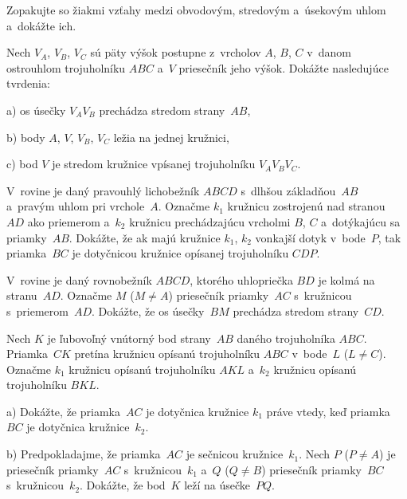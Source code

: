 {
Zopakujte so žiakmi vzťahy medzi obvodovým, stredovým a~úsekovým uhlom a~dokážte
ich.

Nech $V_A$, $V_B$, $V_C$ sú päty výšok postupne z~vrcholov $A$, $B$, $C$ v~danom
ostrouhlom trojuholníku $ABC$ a~$V$ priesečník jeho výšok. Dokážte nasledujúce
tvrdenia:
\item{a)} os úsečky $V_AV_B$ prechádza stredom strany~$AB$,
\item{b)} body $A$, $V$, $V_B$, $V_C$ ležia na jednej kružnici,
\item{c)} bod $V$ je stredom kružnice vpísanej trojuholníku $V_A V_B V_C$.
\endgraf
[a) Podľa Tálesovej vety ležia body $V_A$, $V_B$ na kružnici s~priemerom
$AB$, os sečnice $V_AV_B$ tejto kružnice prechádza jej stredom, čo je stred
$AB$. b), c) Podľa Tálesovej vety ležia body $V_B$, $V_C$ na rôznych
polkružniciach s~priemerom~$AV$. Podľa vety o~obvodovom uhle $|\angle V_B V_C
V|=|\angle V_B A~V|=90^\circ-\gamma$. Z~tetivového štvoruholníka $B V_A V~V_C$
podobne dostaneme $|\angle V_A V_C V|=90^\circ-\gamma$, teda $VV_C$ je
osou uhla $V_A V_C V_B$. Podobne dokážeme, že $VV_A$ je osou uhla $V_B V_A V_C$,
teda $V$ je priesečník osí vnútorných uhlov trojuholníka $V_A V_B V_C$.]

\D
V~rovine je daný pravouhlý lichobežník $ABCD$ s~dlhšou základňou~$AB$ a~pravým
uhlom pri vrchole~$A$. Označme $k_1$ kružnicu zostrojenú nad stranou~$AD$
ako priemerom a~$k_2$ kružnicu prechádzajúcu vrcholmi $B$, $C$ a~dotýkajúcu sa
priamky~$AB$. Dokážte, že ak majú kružnice $k_1$, $ k_2$ vonkajší dotyk v~bode~$P$, tak
priamka~$BC$ je dotyčnicou kružnice opísanej trojuholníku $CDP$.
\vpravo{[52--B--II--4]}

V~rovine je daný rovnobežník $ABCD$, ktorého uhlopriečka $BD$ je kolmá na stranu~$AD$.
Označme $M$ ($M\ne A$) priesečník priamky~$AC$ s~kružnicou s~priemerom~$AD$.
Dokážte, že os úsečky~$BM$ prechádza stredom strany~$CD$.
\vpravo{[56--B--II--3]}

Nech $K$ je ľubovoľný vnútorný bod strany~$AB$ daného trojuholníka $ABC$.
Priamka~$CK$ pretína kružnicu opísanú trojuholníku $ABC$ v~bode~$L$ ($L\ne
C$). Označme $k_1$ kružnicu opísanú trojuholníku $AKL$ a~$k_2$ kružnicu
opísanú trojuholníku $BKL$.
\item{a)} Dokážte, že priamka~$AC$ je dotyčnica kružnice $k_1$ práve vtedy, keď priamka~$BC$ je dotyčnica kružnice~$k_2$.
\item{b)} Predpokladajme, že priamka~$AC$ je sečnicou kružnice~$k_1$. Nech $P$
($P\ne A$) je priesečník priamky~$AC$ s~kružnicou~$k_1$ a~$Q$ ($Q \ne B$)
priesečník priamky~$BC$ s~kružnicou~$k_2$. Dokážte, že bod~$K$ leží na úsečke~$PQ$.
\endgraf
\vpravo{[53--A--II--3]}
}

